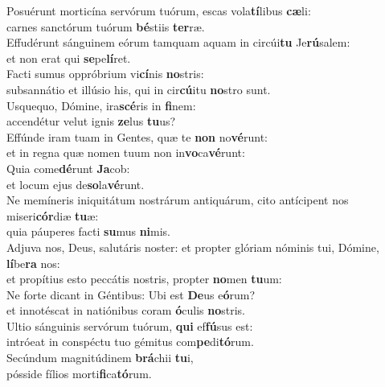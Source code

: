 \evenverse Posuérunt morticína servórum tuórum, escas vola\textbf{tí}libus \textbf{cæ}li:~\*\\
\evenverse carnes sanctórum tuórum \textbf{bé}stiis \textbf{ter}ræ.\\
\oddverse Effudérunt sánguinem eórum tamquam aquam in circúi\textbf{tu} Je\textbf{rú}salem:~\*\\
\oddverse et non erat qui \textbf{se}pe\textbf{lí}ret.\\
\evenverse Facti sumus oppróbrium vi\textbf{cí}nis \textbf{no}stris:~\*\\
\evenverse subsannátio et illúsio his, qui in cir\textbf{cú}itu \textbf{no}stro sunt.\\
\oddverse Usquequo, Dómine, ira\textbf{scé}ris in \textbf{fi}nem:~\*\\
\oddverse accendétur velut ignis \textbf{ze}lus \textbf{tu}us?\\
\evenverse Effúnde iram tuam in Gentes, quæ te \textbf{non} no\textbf{vé}runt:~\*\\
\evenverse et in regna quæ nomen tuum non in\textbf{vo}ca\textbf{vé}runt:\\
\oddverse Quia come\textbf{dé}runt \textbf{Ja}cob:~\*\\
\oddverse et locum ejus de\textbf{so}la\textbf{vé}runt.\\
\evenverse Ne memíneris iniquitátum nostrárum antiquárum, cito antícipent nos miseri\textbf{cór}diæ \textbf{tu}æ:~\*\\
\evenverse quia páuperes facti \textbf{su}mus \textbf{ni}mis.\\
\oddverse Adjuva nos, Deus, salutáris noster: et propter glóriam nóminis tui, Dómine, \textbf{lí}be\textbf{ra} nos:~\*\\
\oddverse et propítius esto peccátis nostris, propter \textbf{no}men \textbf{tu}um:\\
\evenverse Ne forte dicant in Géntibus: Ubi est \textbf{De}us e\textbf{ó}rum?~\*\\
\evenverse et innotéscat in natiónibus coram \textbf{ó}culis \textbf{no}stris.\\
\oddverse Ultio sánguinis servórum tuórum, \textbf{qui} ef\textbf{fú}sus est:~\*\\
\oddverse intróeat in conspéctu tuo gémitus com\textbf{pe}di\textbf{tó}rum.\\
\evenverse Secúndum magnitúdinem \textbf{brá}chii \textbf{tu}i,~\*\\
\evenverse pósside fílios morti\textbf{fi}ca\textbf{tó}rum.\\
